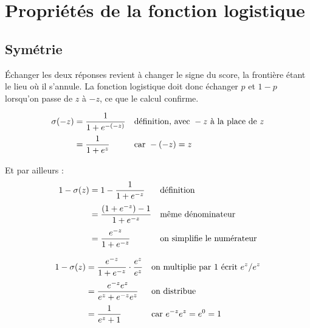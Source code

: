 \chapter{Propriétés de la fonction logistique}
\label{ann:sigmoide}


\section{Symétrie}

Échanger les deux réponses revient à changer le signe du score, la frontière
étant le lieu où il s'annule. La fonction logistique doit donc échanger $p$ et
$1-p$ lorsqu'on passe de $z$ à $-z$, ce que le calcul confirme.

\begin{align}
  \sigma(-z) &= \frac{1}{1+e^{-(-z)}}
    &&\text{définition, avec } -z \text{ à la place de } z \notag\\[2pt]
  &= \frac{1}{1+e^{z}}
    &&\text{car } -(-z)=z \notag\\[2pt]
\end{align}

\slidebreak

Et par ailleurs :
\begin{align}
  1-\sigma(z) &= 1-\frac{1}{1+e^{-z}}
    &&\text{définition} \notag\\[2pt]
  &= \frac{(1+e^{-z})-1}{1+e^{-z}}
    &&\text{même dénominateur} \notag\\[2pt]
  &= \frac{e^{-z}}{1+e^{-z}}
    &&\text{on simplifie le numérateur} \notag
\end{align}

\slidebreak

\begin{align}
  1-\sigma(z)
  &= \frac{e^{-z}}{1+e^{-z}}\cdot\frac{e^{z}}{e^{z}}
    &&\text{on multiplie par } 1 \text{ écrit } e^{z}/e^{z} \notag\\[2pt]
  &= \frac{e^{-z}e^{z}}{e^{z}+e^{-z}e^{z}}
    &&\text{on distribue} \notag\\[2pt]
  &= \frac{1}{e^{z}+1}
    &&\text{car } e^{-z}e^{z}=e^{0}=1 \label{eq:sym}
\end{align}


